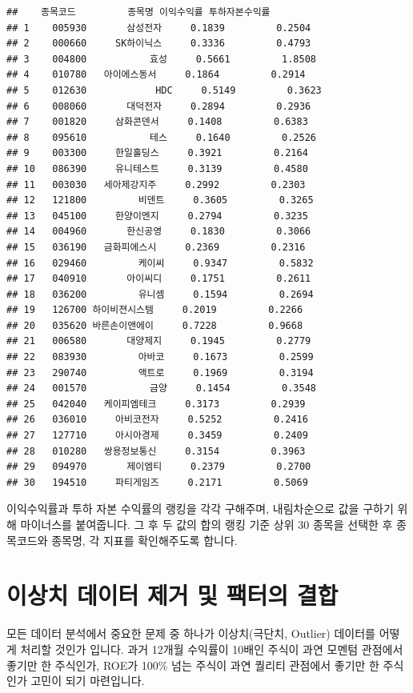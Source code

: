 \documentclass[12pt,]{book}
\begin{document}
\begin{verbatim}
##    종목코드         종목명 이익수익률 투하자본수익률
## 1    005930       삼성전자     0.1839         0.2504
## 2    000660     SK하이닉스     0.3336         0.4793
## 3    004800           효성     0.5661         1.8508
## 4    010780   아이에스동서     0.1864         0.2914
## 5    012630            HDC     0.5149         0.3623
## 6    008060       대덕전자     0.2894         0.2936
## 7    001820     삼화콘덴서     0.1408         0.6383
## 8    095610           테스     0.1640         0.2526
## 9    003300     한일홀딩스     0.3921         0.2164
## 10   086390     유니테스트     0.3139         0.4580
## 11   003030   세아제강지주     0.2992         0.2303
## 12   121800         비덴트     0.3605         0.3265
## 13   045100     한양이엔지     0.2794         0.3235
## 14   004960       한신공영     0.1830         0.3066
## 15   036190   금화피에스시     0.2369         0.2316
## 16   029460         케이씨     0.9347         0.5832
## 17   040910       아이씨디     0.1751         0.2611
## 18   036200         유니셈     0.1594         0.2694
## 19   126700 하이비젼시스템     0.2019         0.2266
## 20   035620 바른손이앤에이     0.7228         0.9668
## 21   006580       대양제지     0.1945         0.2779
## 22   083930         아바코     0.1673         0.2599
## 23   290740         액트로     0.1969         0.3194
## 24   001570           금양     0.1454         0.3548
## 25   042040   케이피엠테크     0.3173         0.2939
## 26   036010     아비코전자     0.5252         0.2416
## 27   127710     아시아경제     0.3459         0.2409
## 28   010280   쌍용정보통신     0.3154         0.3963
## 29   094970       제이엠티     0.2379         0.2700
## 30   194510     파티게임즈     0.2171         0.5069
\end{verbatim}

이익수익률과 투하 자본 수익률의 랭킹을 각각 구해주며, 내림차순으로 값을 구하기 위해 마이너스를 붙여줍니다. 그 후 두 값의 합의 랭킹 기준 상위 30 종목을 선택한 후 종목코드와 종목명, 각 지표를 확인해주도록 합니다.

\hypertarget{section-65}{%
\section{이상치 데이터 제거 및 팩터의 결합}\label{section-65}}

모든 데이터 분석에서 중요한 문제 중 하나가 이상치(극단치, Outlier) 데이터를 어떻게 처리할 것인가 입니다. 과거 12개월 수익률이 10배인 주식이 과연 모멘텀 관점에서 좋기만 한 주식인가, ROE가 100\% 넘는 주식이 과연 퀄리티 관점에서 좋기만 한 주식인가 고민이 되기 마련입니다.
\end{document}
